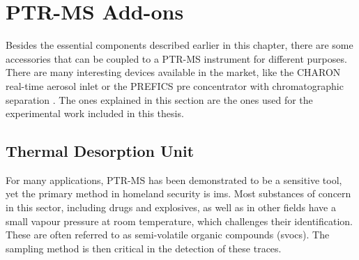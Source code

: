 





\section{PTR-MS Add-ons}
Besides the essential components described  earlier in this chapter, there are some accessories that can be coupled to a PTR-MS instrument for different purposes.
There are many interesting devices available in the market, like the CHARON real-time aerosol inlet \cite{muller2017direct} or the PREFICS pre concentrator with chromatographic separation \cite{prefics}.
The ones explained in this section are the ones used for the experimental work included in this thesis.




\subsection{Thermal Desorption Unit}\label{section:tdu}
For many applications, PTR-MS has been demonstrated to be a sensitive tool, yet the primary method in homeland security is \acrshort{ims}.
%
Most substances of concern in this sector, including drugs and explosives, as well as in other fields have a small vapour pressure at room temperature, which challenges their identification. These are often referred to as semi-volatile organic compounds (\acrshort{svoc}s).
%
The sampling method is then critical in the detection of these traces.


